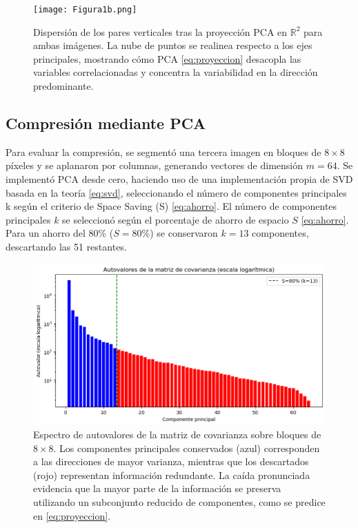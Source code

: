 \documentclass[12pt]{article}
\begin{document}
\begin{figure}[H]
    \centering
    \texttt{[image: Figura1b.png]}
    \caption{Dispersión de los pares verticales tras la proyección PCA en $\mathbb{R}^2$ para ambas imágenes. La nube de puntos se realinea respecto a los ejes principales, mostrando cómo PCA \eqref{eq:proyeccion} desacopla las variables correlacionadas y concentra la variabilidad en la dirección predominante.}
    \label{fig:ej1b}
\end{figure}

\subsection{Compresión mediante PCA}
Para evaluar la compresión, se segmentó una tercera imagen en bloques de $8\times 8$ píxeles y se aplanaron por columnas, generando vectores de dimensión $m=64$. Se implementó PCA desde cero, haciendo uso de una implementación propia de SVD basada en la teoría \eqref{eq:svd}, seleccionando el número de componentes principales k según el criterio de Space Saving (S) \eqref{eq:ahorro}. El número de componentes principales $k$ se seleccionó según el porcentaje de ahorro de espacio $S$ \eqref{eq:ahorro}. Para un ahorro del 80\% ($S=80\%$) se conservaron $k=13$ componentes, descartando las 51 restantes.

\begin{figure}[H]
    \centering
    \includegraphics[width=1\textwidth]{Ejercicio3.png}
    \caption{Espectro de autovalores de la matriz de covarianza sobre bloques de $8\times 8$. Los componentes principales conservados (azul) corresponden a las direcciones de mayor varianza, mientras que los descartados (rojo) representan información redundante. La caída pronunciada evidencia que la mayor parte de la información se preserva utilizando un subconjunto reducido de componentes, como se predice en \eqref{eq:proyeccion}.}
    \label{fig:ej2}
\end{figure}
\end{document}
